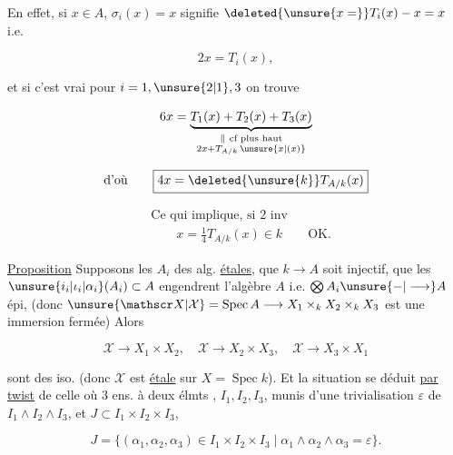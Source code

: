 
En effet, si $x\in A$, $\sigma_i(x)=x$ signifie $\deleted{\unsure{x=}}T_i(x)-x=x$ i.e.

\[
 2x=T_i(x),
\]

et si c'est vrai pour $i=1,\unsure{2|1},3$ on trouve

\[
 6x=\underbrace{T_1(x)+T_2(x)+T_3(x)}_{\substack{\Vert\ \text{cf plus haut}\\ 2x+T_{A/k}\,\unsure{x|(x)}}}
\]

\[
 \text{d'où}\qquad\boxed{4x=\deleted{\unsure{k}}T_{A/k}(x)}
\]

\[
 \begin{aligned}
 &\text{Ce qui implique, si 2 inv}\\
 &\qquad x=\frac14 T_{A/k}(x)\in k\qquad\text{OK.}
 \end{aligned}
\]


\uline{Proposition} Supposons les $A_i$ des alg.  \uline{étales}, que $k\longrightarrow A$ soit injectif, que les $\unsure{i_i|\iota_i|\alpha_i}(A_i)\subset A$ engendrent l'algèbre $A$ i.e. $\bigotimes A_i\unsure{\mathord{-}|\longrightarrow}A$ épi, (donc $\unsure{\mathscr X|\mathcal X}=\operatorname{Spec} A\longrightarrow X_1\times_k X_2\times_k X_3$ est une immersion fermée) Alors    

\[
 \mathscr X\longrightarrow X_1\times X_2,\quad \mathscr X\longrightarrow X_2\times X_3,\quad \mathscr X\longrightarrow X_3\times X_1
\]

sont des iso. (donc $\mathscr X$ est  \uline{étale} sur $X=\operatorname{Spec} k$). Et la situation se déduit \uline{par twist} de celle où 3 ens. à deux élmts \deleted{\unsure{$\xi$}}, $I_1,I_2,I_3$, munis d'une trivialisation $\varepsilon$ de $I_1\wedge I_2\wedge I_3$, et  $J\subset I_1\times I_2\times I_3$,

\[
 J=\{(\alpha_1,\alpha_2,\alpha_3)\in I_1\times I_2\times I_3\mid \alpha_1\wedge\alpha_2\wedge\alpha_3=\varepsilon\}.
\]

